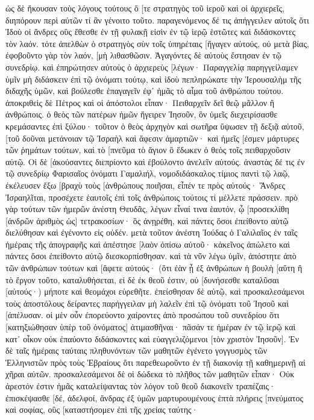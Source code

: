 ὡς δὲ ἤκουσαν τοὺς λόγους τούτους ὅ [τε στρατηγὸς τοῦ ἱεροῦ καὶ οἱ ἀρχιερεῖς, διηπόρουν περὶ αὐτῶν τί ἂν γένοιτο τοῦτο. 
παραγενόμενος δέ τις ἀπήγγειλεν αὐτοῖς ὅτι Ἰδοὺ οἱ ἄνδρες οὓς ἔθεσθε ἐν τῇ φυλακῇ εἰσὶν ἐν τῷ ἱερῷ ἑστῶτες καὶ διδάσκοντες τὸν λαόν. 
τότε ἀπελθὼν ὁ στρατηγὸς σὺν τοῖς ὑπηρέταις [ἤγαγεν αὐτούς, οὐ μετὰ βίας, ἐφοβοῦντο γὰρ τὸν λαόν, [μὴ λιθασθῶσιν. 
Ἀγαγόντες δὲ αὐτοὺς ἔστησαν ἐν τῷ συνεδρίῳ. καὶ ἐπηρώτησεν αὐτοὺς ὁ ἀρχιερεὺς 
[λέγων· Παραγγελίᾳ παρηγγείλαμεν ὑμῖν μὴ διδάσκειν ἐπὶ τῷ ὀνόματι τούτῳ, καὶ ἰδοὺ πεπληρώκατε τὴν Ἰερουσαλὴμ τῆς διδαχῆς ὑμῶν, καὶ βούλεσθε ἐπαγαγεῖν ἐφ᾽ ἡμᾶς τὸ αἷμα τοῦ ἀνθρώπου τούτου. 
ἀποκριθεὶς δὲ Πέτρος καὶ οἱ ἀπόστολοι εἶπαν· Πειθαρχεῖν δεῖ θεῷ μᾶλλον ἢ ἀνθρώποις. 
ὁ θεὸς τῶν πατέρων ἡμῶν ἤγειρεν Ἰησοῦν, ὃν ὑμεῖς διεχειρίσασθε κρεμάσαντες ἐπὶ ξύλου· 
τοῦτον ὁ θεὸς ἀρχηγὸν καὶ σωτῆρα ὕψωσεν τῇ δεξιᾷ αὐτοῦ, [τοῦ δοῦναι μετάνοιαν τῷ Ἰσραὴλ καὶ ἄφεσιν ἁμαρτιῶν· 
καὶ ἡμεῖς [ἐσμεν μάρτυρες τῶν ῥημάτων τούτων, καὶ τὸ [πνεῦμα τὸ ἅγιον ὃ ἔδωκεν ὁ θεὸς τοῖς πειθαρχοῦσιν αὐτῷ. 
Οἱ δὲ [ἀκούσαντες διεπρίοντο καὶ ἐβούλοντο ἀνελεῖν αὐτούς. 
ἀναστὰς δέ τις ἐν τῷ συνεδρίῳ Φαρισαῖος ὀνόματι Γαμαλιήλ, νομοδιδάσκαλος τίμιος παντὶ τῷ λαῷ, ἐκέλευσεν ἔξω [βραχὺ τοὺς [ἀνθρώπους ποιῆσαι, 
εἶπέν τε πρὸς αὐτούς· Ἄνδρες Ἰσραηλῖται, προσέχετε ἑαυτοῖς ἐπὶ τοῖς ἀνθρώποις τούτοις τί μέλλετε πράσσειν. 
πρὸ γὰρ τούτων τῶν ἡμερῶν ἀνέστη Θευδᾶς, λέγων εἶναί τινα ἑαυτόν, ᾧ [προσεκλίθη [ἀνδρῶν ἀριθμὸς ὡς] τετρακοσίων· ὃς ἀνῃρέθη, καὶ πάντες ὅσοι ἐπείθοντο αὐτῷ διελύθησαν καὶ ἐγένοντο εἰς οὐδέν. 
μετὰ τοῦτον ἀνέστη Ἰούδας ὁ Γαλιλαῖος ἐν ταῖς ἡμέραις τῆς ἀπογραφῆς καὶ ἀπέστησε [λαὸν ὀπίσω αὐτοῦ· κἀκεῖνος ἀπώλετο καὶ πάντες ὅσοι ἐπείθοντο αὐτῷ διεσκορπίσθησαν. 
καὶ τὰ νῦν λέγω ὑμῖν, ἀπόστητε ἀπὸ τῶν ἀνθρώπων τούτων καὶ [ἄφετε αὐτούς· (ὅτι ἐὰν ᾖ ἐξ ἀνθρώπων ἡ βουλὴ [αὕτη ἢ τὸ ἔργον τοῦτο, καταλυθήσεται, 
εἰ δὲ ἐκ θεοῦ ἐστιν, οὐ [δυνήσεσθε καταλῦσαι [αὐτούς·) μήποτε καὶ θεομάχοι εὑρεθῆτε. ἐπείσθησαν δὲ αὐτῷ, 
καὶ προσκαλεσάμενοι τοὺς ἀποστόλους δείραντες παρήγγειλαν μὴ λαλεῖν ἐπὶ τῷ ὀνόματι τοῦ Ἰησοῦ καὶ [ἀπέλυσαν. 
οἱ μὲν οὖν ἐπορεύοντο χαίροντες ἀπὸ προσώπου τοῦ συνεδρίου ὅτι [κατηξιώθησαν ὑπὲρ τοῦ ὀνόματος] ἀτιμασθῆναι· 
πᾶσάν τε ἡμέραν ἐν τῷ ἱερῷ καὶ κατ᾽ οἶκον οὐκ ἐπαύοντο διδάσκοντες καὶ εὐαγγελιζόμενοι [τὸν χριστὸν Ἰησοῦν]. 
Ἐν δὲ ταῖς ἡμέραις ταύταις πληθυνόντων τῶν μαθητῶν ἐγένετο γογγυσμὸς τῶν Ἑλληνιστῶν πρὸς τοὺς Ἑβραίους ὅτι παρεθεωροῦντο ἐν τῇ διακονίᾳ τῇ καθημερινῇ αἱ χῆραι αὐτῶν. 
προσκαλεσάμενοι δὲ οἱ δώδεκα τὸ πλῆθος τῶν μαθητῶν εἶπαν· Οὐκ ἀρεστόν ἐστιν ἡμᾶς καταλείψαντας τὸν λόγον τοῦ θεοῦ διακονεῖν τραπέζαις· 
ἐπισκέψασθε [δέ, ἀδελφοί, ἄνδρας ἐξ ὑμῶν μαρτυρουμένους ἑπτὰ πλήρεις [πνεύματος καὶ σοφίας, οὓς [καταστήσομεν ἐπὶ τῆς χρείας ταύτης· 
